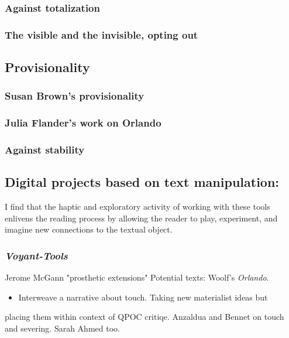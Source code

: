 \documentclass[11pt]{article}
\begin{document}
\subsubsection{Against totalization}
\label{sec:orgaf7b275}
\subsubsection{The visible and the invisible, opting out}
\label{sec:org58e091b}


\subsection{Provisionality}
\label{sec:org417dd18}

\subsubsection{Susan Brown's provisionality}
\label{sec:orga7e1411}
\subsubsection{Julia Flander's work on Orlando}
\label{sec:org90f4113}
\subsubsection{Against stability}
\label{sec:org4e3ad55}


\subsection{Digital projects based on text manipulation:}
\label{sec:org12ac6e4}
I find that the haptic and exploratory activity of working with these
tools enlivens the reading process by allowing the reader to play,
experiment, and imagine new connections to the textual object.

\subsubsection{\emph{Voyant-Tools}}
\label{sec:org58fc9ad}
Jerome McGann "prosthetic extensions"
Potential texts: Woolf's \emph{Orlando}. 

\begin{itemize}
\item Interweave a narrative about touch. Taking new materialist ideas but
\end{itemize}
placing them within context of QPOC critiqe. Anzaldua and Bennet on
touch and severing. Sarah Ahmed too. 
\end{document}

